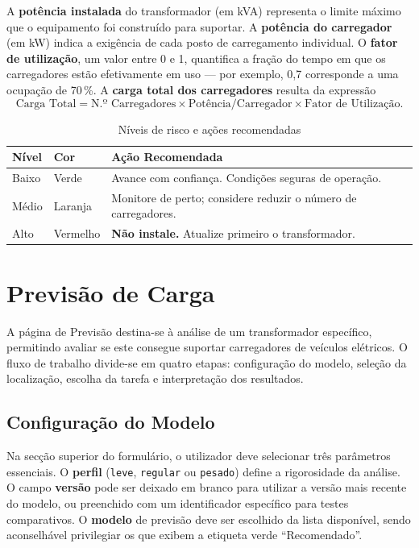 \documentclass[11pt,a4paper,openany]{book}
\newcommand{\kva}{kVA}
\newcommand{\kw}{kW}
\begin{document}
A \textbf{potência instalada} do transformador (em \kva) representa o limite máximo que o equipamento foi construído para suportar. A \textbf{potência do carregador} (em \kw) indica a exigência de cada posto de carregamento individual. O \textbf{fator de utilização}, um valor entre 0 e 1, quantifica a fração do tempo em que os carregadores estão efetivamente em uso --- por exemplo, 0,7 corresponde a uma ocupação de 70\,\%. A \textbf{carga total dos carregadores} resulta da expressão
\[
\text{Carga Total} = \text{N.º Carregadores} \times \text{Potência/Carregador} \times \text{Fator de Utilização}.
\]

\begin{table}[H]
\centering
\caption{Níveis de risco e ações recomendadas}\label{tab:riscos}
\begin{tabular}{@{}llp{6cm}@{}}
\toprule
\textbf{Nível} & \textbf{Cor} & \textbf{Ação Recomendada} \\
\midrule
Baixo & Verde & Avance com confiança. Condições seguras de operação. \\
Médio & Laranja & Monitore de perto; considere reduzir o número de carregadores. \\
Alto & Vermelho & \textbf{Não instale.} Atualize primeiro o transformador. \\
\bottomrule
\end{tabular}
\end{table}

\chapter{Previsão de Carga}\label{ch:previsao}

A página de Previsão destina-se à análise de um transformador específico, permitindo avaliar se este consegue suportar carregadores de veículos elétricos. O fluxo de trabalho divide-se em quatro etapas: configuração do modelo, seleção da localização, escolha da tarefa e interpretação dos resultados.

\section{Configuração do Modelo}

Na secção superior do formulário, o utilizador deve selecionar três parâmetros essenciais. O \textbf{perfil} (\texttt{leve}, \texttt{regular} ou \texttt{pesado}) define a rigorosidade da análise. O campo \textbf{versão} pode ser deixado em branco para utilizar a versão mais recente do modelo, ou preenchido com um identificador específico para testes comparativos. O \textbf{modelo} de previsão deve ser escolhido da lista disponível, sendo aconselhável privilegiar os que exibem a etiqueta verde ``Recomendado''.
\end{document}
